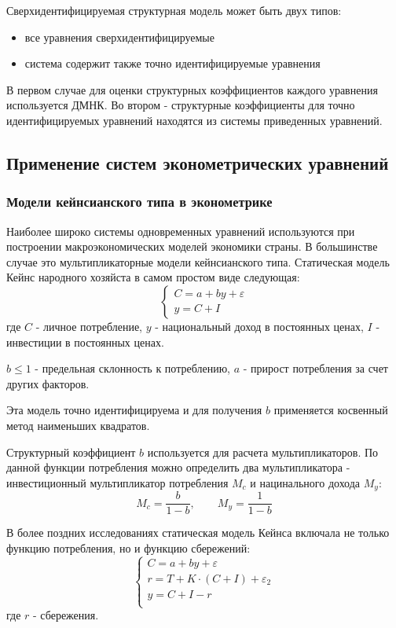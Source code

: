 \documentclass[aps,%
12pt,%
final,%
oneside,
onecolumn,%
musixtex, %
superscriptaddress,%
centertags]{article} %
\theoremstyle{plain}
\theoremstyle{definition}
\theoremstyle{remark}
\begin{document}
Сверхидентифицируемая структурная модель может быть двух типов:

\begin{itemize}
	\item все уравнения сверхидентифицируемые
	\item система содержит также точно идентифицируемые уравнения
\end{itemize}

В первом случае для оценки структурных коэффициентов каждого уравнения используется ДМНК. Во втором - структурные коэффициенты для точно идентифицируемых уравнений находятся из системы приведенных уравнений.

\newpage
\subsection{Применение систем эконометрических уравнений}

\subsubsection{Модели кейнсианского типа в эконометрике}

Наиболее широко системы одновременных уравнений используются при построении макроэкономических моделей экономики страны. В большинстве случае это мультипликаторные модели кейнсианского типа. Статическая модель Кейнс народного хозяйста в самом простом виде следующая:
$$\begin{cases}
	C = a + by + \varepsilon \\
	y = C + I
\end{cases}$$
где $C$ - личное потребление, $y$ - национальный доход в постоянных ценах, $I$ - инвестиции в постоянных ценах.

$b\leq 1$ - предельная склонность к потреблению, $a$ - прирост потребления за счет других факторов.

Эта модель точно идентифицируема и для получения $b$ применяется косвенный метод наименьших квадратов.

Структурный коэффициент $b$ используется для расчета мультипликаторов. По данной функции потребления можно определить два мультипликатора - инвестиционный мультипликатор потребления $M_c$ и нацинального дохода $M_y$:
$$M_c = \frac{b}{1-b}, \qquad M_y = \frac{1}{1-b}$$

В более поздних исследованиях статическая модель Кейнса включала не только функцию потребления, но и функцию сбережений:
$$\begin{cases}
	C = a + by + \varepsilon \\
	r = T + K \cdot (C + I) + \varepsilon_2 \\
	y = C + I - r \\
\end{cases}$$
где $r$ - сбережения.
\end{document}
